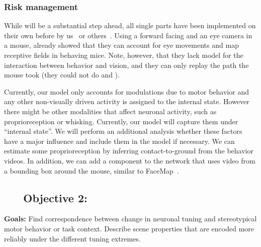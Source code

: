 \documentclass[B2,COG]{ercgrant}
\begin{document}
\subsubsection{Risk management} 
While  will be a substantial step ahead, all single parts have been implemented on their own before by us~\parencite{Sinz2018-sk, Bashiri2021-or} or others~\parencite{Parker2022-ac,Holmgren2021-jv}. 
Using a forward facing and an eye camera in a mouse, \textcite{Parker2022-ac} already showed that they can account for eye movements and map receptive fields in behaving mice. Note, however, that they lack model for the interaction between behavior and vision, and they can only replay the path the mouse took (they could not do  and ).

Currently, our model only accounts for modulations due to motor behavior and any other non-visually driven activity is assigned to the internal state. 
However there might be other modalities that affect neuronal activity, such as proprioreception or whisking. 
Currently, our model will capture them under ``internal state''.
We will perform an additional analysis whether these factors have a major influence and include them in the model if necessary. 
We can estimate some proprioreception by inferring contact-to-ground from the behavior videos.
In addition, we can add a component to the network that uses video from a bounding box around the mouse, similar to FaceMap~\parencite{Syeda2022-bk}.

\subsection{\colorbox{obj2}{\textcolor{white}{O2}} Objective 2: \otwotitle}


\textbf{Goals:} Find correspondence between change in neuronal tuning and stereotypical motor behavior or task context.
Describe scene properties that are encoded more reliably under the different tuning extremes. 
\end{document}
